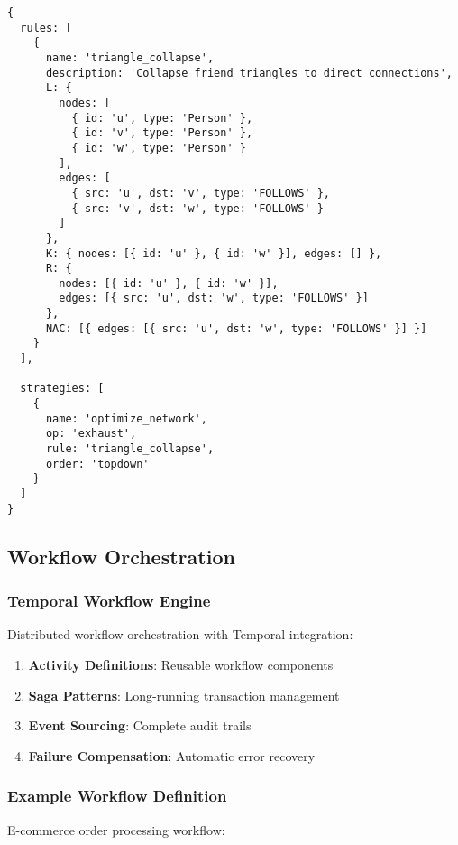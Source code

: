 \documentclass[11pt,a4paper]{article}
\begin{document}
\begin{lstlisting}[language=jsonnet,caption=Triangle Collapse Rule]
{
  rules: [
    {
      name: 'triangle_collapse',
      description: 'Collapse friend triangles to direct connections',
      L: {
        nodes: [
          { id: 'u', type: 'Person' },
          { id: 'v', type: 'Person' },
          { id: 'w', type: 'Person' }
        ],
        edges: [
          { src: 'u', dst: 'v', type: 'FOLLOWS' },
          { src: 'v', dst: 'w', type: 'FOLLOWS' }
        ]
      },
      K: { nodes: [{ id: 'u' }, { id: 'w' }], edges: [] },
      R: {
        nodes: [{ id: 'u' }, { id: 'w' }],
        edges: [{ src: 'u', dst: 'w', type: 'FOLLOWS' }]
      },
      NAC: [{ edges: [{ src: 'u', dst: 'w', type: 'FOLLOWS' }] }]
    }
  ],

  strategies: [
    {
      name: 'optimize_network',
      op: 'exhaust',
      rule: 'triangle_collapse',
      order: 'topdown'
    }
  ]
}
\end{lstlisting}

\subsection{Workflow Orchestration}
\label{subsec:workflow_orchestration}

\subsubsection{Temporal Workflow Engine}
\label{subsubsec:temporal_workflow}

Distributed workflow orchestration with Temporal integration:

\begin{enumerate}
\item \textbf{Activity Definitions}: Reusable workflow components
\item \textbf{Saga Patterns}: Long-running transaction management
\item \textbf{Event Sourcing}: Complete audit trails
\item \textbf{Failure Compensation}: Automatic error recovery
\end{enumerate}

\subsubsection{Example Workflow Definition}
\label{subsubsec:workflow_example}

E-commerce order processing workflow:
\end{document}
